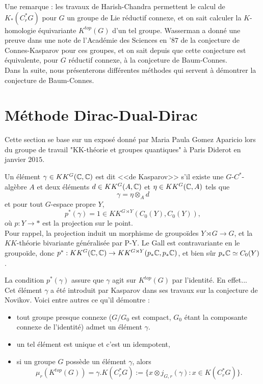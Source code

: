 Une remarque : les travaux de Harish-Chandra permettent le calcul de $K_*(C^*_r G)$ pour $G$ un groupe de Lie réductif connexe, et on sait calculer la $K$-homologie équivariante $K^{top}(G)$ d'un tel groupe. Wasserman a donné une preuve dans une note de l'Académie des Sciences en '$87$ de la conjecture de Connes-Kasparov pour ces groupes, et on sait depuis que cette conjecture est équivalente, pour $G$ réductif connexe, à la conjceture de Baum-Connes.\\

Dans la suite, nous présenterons différentes méthodes qui servent à démontrer la conjecture de Baum-Connes.\\

\section{Méthode Dirac-Dual-Dirac}
Cette section se base sur un exposé donné par Maria Paula Gomez Aparicio lors du groupe de travail "KK-théorie et groupes quantiques" à Paris Diderot en janvier $2015$.\\

\begin{definition}
Un élément $\gamma \in KK^{G}(\mathbb C,\mathbb C)$ est dit <<de Kasparov>> s'il existe une $G$-$C^*$-algèbre $A$ et deux éléments $d\in KK^{G}(A,\mathbb C)$ et $\eta \in KK^{G}(\mathbb C,A)$ tels que
\[\gamma = \eta \otimes_A d \]
et pour tout $G$-espace propre $Y$,
\[p^*(\gamma)=1\in KK^{G\rtimes Y}(C_0(Y),C_0(Y)),\]
où $p : Y\rightarrow *$ est la projection sur le point. \\

Pour rappel, la projection induit un morphisme de groupoïdes $Y \rtimes G\rightarrow G$, et la $KK$-théorie bivariante généralisée par P-Y. Le Gall est contravariante en le groupoïde, donc $p^* : KK^G(\mathbb C,\mathbb C)\rightarrow KK^{G\rtimes Y}(p_* \mathbb C,p_* \mathbb C)$, et bien sûr $p_*\mathbb C \simeq C_0(Y)$.
\end{definition}%

La condition $p^*(\gamma)$ assure que $\gamma$ agit sur $K^{top}(G)$ par l'identité. En effet...\\

Cet élément $\gamma$ a été introduit par Kasparov dans ses travaux sur la conjecture de Novikov. Voici entre autres ce qu'il démontre :
\begin{itemize}
\item tout groupe presque connexe ($G/G_0$ est compact, $G_0$ étant la composante connexe de l'identité) admet un élément $\gamma$.
\item un tel élément est unique et c'est un idempotent,
\item si un groupe $G$ possède un élément $\gamma$, alors 
\[\mu_r(K^{top}(G)) = \gamma.K(C^*_r G) := \{x\otimes j_{G,r}(\gamma) : x\in K(C^*_r G)\}.\]
\end{itemize}

